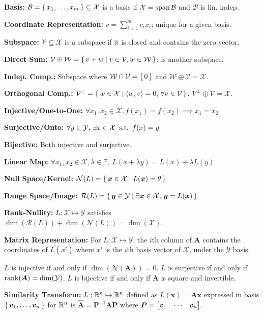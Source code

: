 \documentclass[twocolumn, 8pt]{extarticle}
\begin{document}
\textbf{Basis:} \(\mathcal B = \set{x_1, \dots, x_m} \subseteq \mathcal X\) is a basis if
\(\mathcal X = \operatorname{span}\mathcal B\) and \(\mathcal B\) is lin. indep.

\textbf{Coordinate Representation:} \(v = \sum _{i = 1}^m c_ix_i\); unique for a given basis.

\textbf{Subspace:} \(\mathcal V \subseteq \mathcal X\) is a subspace if it is closed and contains the zero vector.

\textbf{Direct Sum:} \(\mathcal V \oplus \mathcal W = \set{v + w | v \in \mathcal V, w \in \mathcal W}\); is another subspace.

\textbf{Indep. Comp.:} Subspace where \(\mathcal W \cap \mathcal V = \set{0}\) and \(\mathcal W \oplus
\mathcal V = \mathcal X\).

\textbf{Orthogonal Comp.:} \(\mathcal V^\perp = \set{w \in \mathcal X | \langle {w}, {v} \rangle = 0,\,\forall v \in \mathcal V}\).
\(\mathcal V^\perp \oplus \mathcal V = \mathcal X\).

\textbf{Injective/One-to-One:} \(\forall x_1, x_2 \in \mathcal X, f(x_1) = f(x_2) \implies x_1 = x_2\)

\textbf{Surjective/Onto:} \(\forall y \in \mathcal Y,\,\exists x \in \mathcal X \enspace\mathrm{s.t.}\enspace f(x) = y\)

\textbf{Bijective:} Both injective and surjective.

\textbf{Linear Map:} \(\forall x_1, x_2 \in \mathcal X, \lambda \in \mathbb F,\, L(x + \lambda y) = L(x) + \lambda L(y)\)

\textbf{Null Space/Kernel:} \(\mathcal N(L) = \set{\bm x \in \mathcal X | L(\bm x) = \theta}\)

\textbf{Range Space/Image:} \(\mathcal R(L) = \set{\bm y \in \mathcal Y | \exists \bm x \in \mathcal X,\,\bm y = L(\bm x)}\)

\textbf{Rank-Nullity:} \(L: \mathcal X \mapsto \mathcal Y\) satisfies \(\dim(\mathcal R(L)) + \dim(\mathcal N(L)) = \dim(\mathcal X)\).

\textbf{Matrix Representation:} For \(L: \mathcal X \mapsto \mathcal Y\), the \(i\)th column of \(\bm A\) contains the
coordinates of \(L(x^i)\) where \(x^i\) is the \(i\)th basis vector of \(\mathcal X\), under the \(\mathcal Y\) basis.

\(L\) is injective if and only if \(\dim(\mathcal N(\bm A)) = 0\). \(L\) is surjective if and only if \(\operatorname{rank}(\bm A) =
\dim(\mathcal Y)\). \(L\) is bijective if and only if \(\bm A\) is square and invertible.

\textbf{Similarity Transform:} \(L: \mathbb{R}^n \mapsto \mathbb{R}^n\) defined as \(L(\bm x) = \bm A\bm x\) expressed in basis
\(\set{\bm v_1, \dots, \bm v_n}\) for \(\mathbb{R}^n\) is \(\hat{\bm A} = \bm P^{-1}\bm A\bm P\) where \(\bm P = \rvec{\bm
v_1}{\cdots}{\bm v_n}\).
\end{document}
